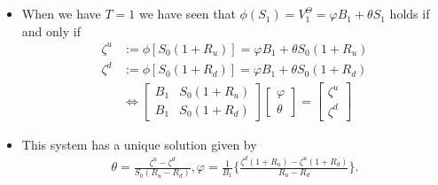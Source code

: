 \documentclass{beamer}
\numberwithin{equation}{section}
\begin{document}
\begin{frame}\frametitle{{\normalsize \secname} \\ {\large \subsecname}}
    \begin{itemize}
        \item When we have $T=1$ we have seen that $\phi(S_1) = V_1^{\Theta} = \varphi B_1 + \theta S_1$ holds if and only if
        \begin{align*}
            \zeta^u &:= \phi [S_0(1+R_u)] = \varphi B_1 + \theta S_0(1+R_u)\\
            \zeta^d &:= \phi [S_0(1+R_d)] = \varphi B_1 + \theta S_0(1+R_d) \\
            & \Leftrightarrow \begin{bmatrix} B_1 & S_0(1 + R_u)\\ B_1 & S_0(1 + R_d)\end{bmatrix} \begin{bmatrix} \varphi \\ \theta \end{bmatrix} = \begin{bmatrix} \zeta^u\\ \zeta^d\end{bmatrix}
        \end{align*}
            \item This system has a unique solution given by
        \begin{align*}
            \theta = \frac{\zeta^u - \zeta^d}{S_0 (R_u - R_d)}, \varphi = \frac{1}{B_1} \Bigg\{ \frac{\zeta^d(1+R_u) - \zeta^u(1+R_d)}{R_u - R_d} \Bigg\}.
        \end{align*}
    \end{itemize}
\end{frame}
\end{document}
